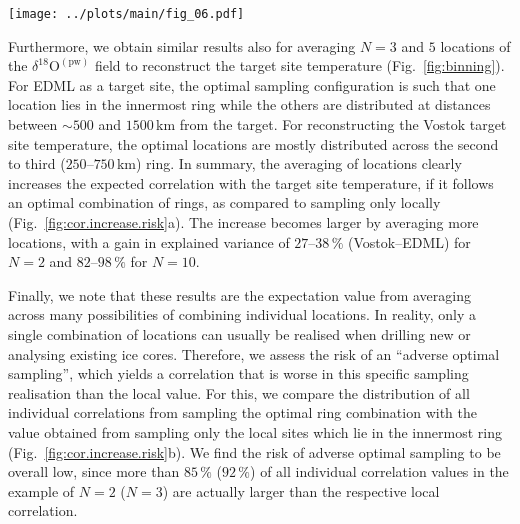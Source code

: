\documentclass[cp, manuscript, draft]{copernicus}
\begin{document}
\begin{figure*}[t]%
\centering
\texttt{[image: ../plots/main/fig\_06.pdf]}
\caption{%
  The optimal arrangement for averaging three or five
  $\delta^{18}\mathrm{O}^{\mathrm{(pw)}}$ ice cores to reconstruct the target
  site temperature at the EDML (\textbf{a}, \textbf{c}) and Vostok (\textbf{b},
  \textbf{d}) drilling sites. Displayed are subsets of the sampling correlation
  structures for $N=3$ and $5$, showing the optimal five of all possible
  combinations of rings, i.e. those which exhibit the highest mean correlation
  across $10^5$ random trials of averaging $N=3$ (\textbf{c}, \textbf{d}) or
  $N=5$ (\textbf{a}, \textbf{b}) grid cells from these rings.}
\label{fig:binning}%
\end{figure*}%

Furthermore, we obtain similar results also for averaging $N=3$ and $5$
locations of the $\delta^{18}\mathrm{O}^{\mathrm{(pw)}}$ field to reconstruct
the target site temperature (Fig.~\ref{fig:binning}). For EDML as a target site,
the optimal sampling configuration is such that one location lies in the
innermost ring while the others are distributed at distances between $\sim500$
and $1500$\,km from the target. For reconstructing the Vostok target site
temperature, the optimal locations are mostly distributed across the second to
third ($250$--$750$\,km) ring. In summary, the averaging of locations clearly
increases the expected correlation with the target site temperature, if it
follows an optimal combination of rings, as compared to sampling only locally
(Fig.~\ref{fig:cor.increase.risk}a). The increase becomes larger by averaging
more locations, with a gain in explained variance of $27$--$38\,\%$
(Vostok--EDML) for $N=2$ and $82$--$98\,\%$ for $N=10$.

Finally, we note that these results are the expectation value from averaging
across many possibilities of combining individual locations. In reality, only a
single combination of locations can usually be realised when drilling new or
analysing existing ice cores. Therefore, we assess the risk of an ``adverse
optimal sampling'', which yields a correlation that is worse in this specific
sampling realisation than the local value. For this, we compare the distribution
of all individual correlations from sampling the optimal ring combination with
the value obtained from sampling only the local sites which lie in the innermost
ring (Fig.~\ref{fig:cor.increase.risk}b). We find the risk of adverse optimal
sampling to be overall low, since more than $85\,\%$ ($92\,\%$) of all
individual correlation values in the example of $N=2$ ($N=3$) are actually
larger than the respective local correlation.
\end{document}
